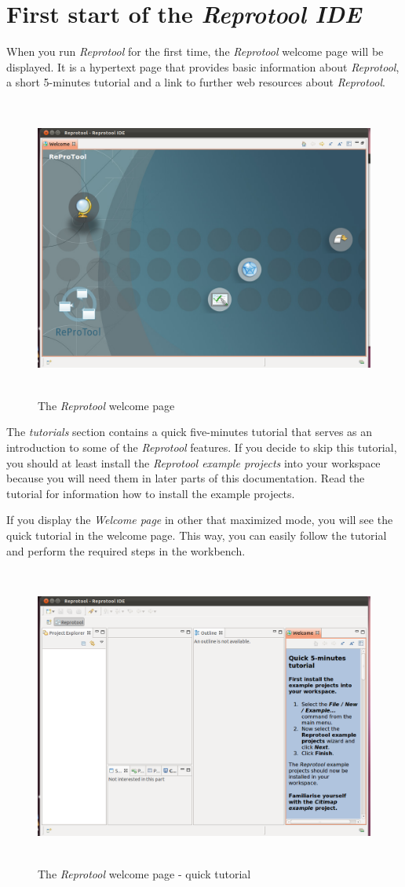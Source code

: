 \section{First start of the \emph{Reprotool IDE}}
When you run \emph{Reprotool} for the first time, the \emph{Reprotool} welcome page will be displayed. It is a hypertext page that
provides basic information about \emph{Reprotool}, a short 5-minutes tutorial and a link to further web resources about \emph{Reprotool}.

\begin{figure}[ht]
  \centering
  \includegraphics[height=280pt]{images/reprotoolWelcome}
  \caption{The \emph{Reprotool} welcome page}
  \label{fig:reprotoolWelcome}
\end{figure}

The \emph{tutorials} section contains a quick five-minutes tutorial that serves as an introduction to some of the \emph{Reprotool}
features. If you decide to skip this tutorial, you should at least install the \emph{Reprotool example projects} into your workspace
because you will need them in later parts of this documentation. Read the tutorial for information how to install the example projects.

If you display the \emph{Welcome page} in other that maximized mode, you will see the quick tutorial in the welcome page. This way, you
can easily follow the tutorial and perform the required steps in the workbench.

\begin{figure}[ht]
  \centering
  \includegraphics[height=280pt]{images/reprotoolWelcomeTutorial}
  \caption{The \emph{Reprotool} welcome page - quick tutorial}
  \label{fig:reprotoolWelcomeTutorial}
\end{figure}